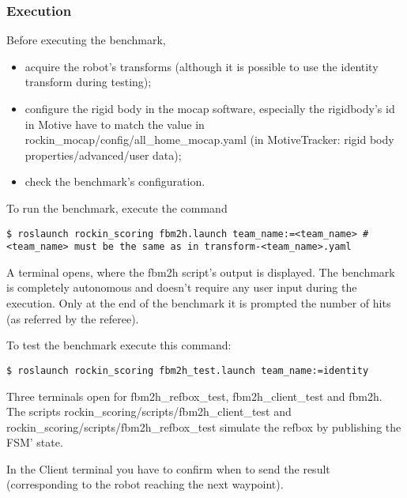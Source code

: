 \documentclass[a4paper]{article}
\begin{document}

\subsubsection{Execution}
\label{sec:fbm2h_execution}

Before executing the benchmark,
\begin{itemize}
  \item acquire the robot's transforms (although it is possible to use the identity transform during testing);
  \item configure the rigid body in the mocap software, especially the rigidbody's id in Motive have to match the value in rockin\_mocap/config/all\_home\_mocap.yaml (in MotiveTracker: rigid body properties/advanced/user data);
  \item check the benchmark's configuration.
\end{itemize}


To run the benchmark, execute the command
\begin{verbatim}
$ roslaunch rockin_scoring fbm2h.launch team_name:=<team_name> # <team_name> must be the same as in transform-<team_name>.yaml
\end{verbatim} 

A terminal opens, where the fbm2h script's output is displayed.
The benchmark is completely autonomous and doesn't require any user input during the execution.
Only at the end of the benchmark it is prompted the number of hits (as referred by the referee).


\label{sec:fbm2h_testing_with_mocap_system}

To test the benchmark execute this command:
\begin{verbatim}
$ roslaunch rockin_scoring fbm2h_test.launch team_name:=identity
\end{verbatim} 

Three terminals open for fbm2h\_refbox\_test, fbm2h\_client\_test and fbm2h.
The scripts rockin\_scoring/scripts/fbm2h\_client\_test and rockin\_scoring/scripts/fbm2h\_refbox\_test simulate the refbox by publishing the FSM' state.

In the Client terminal you have to confirm when to send the result (corresponding to the robot reaching the next waypoint).


\end{document}
